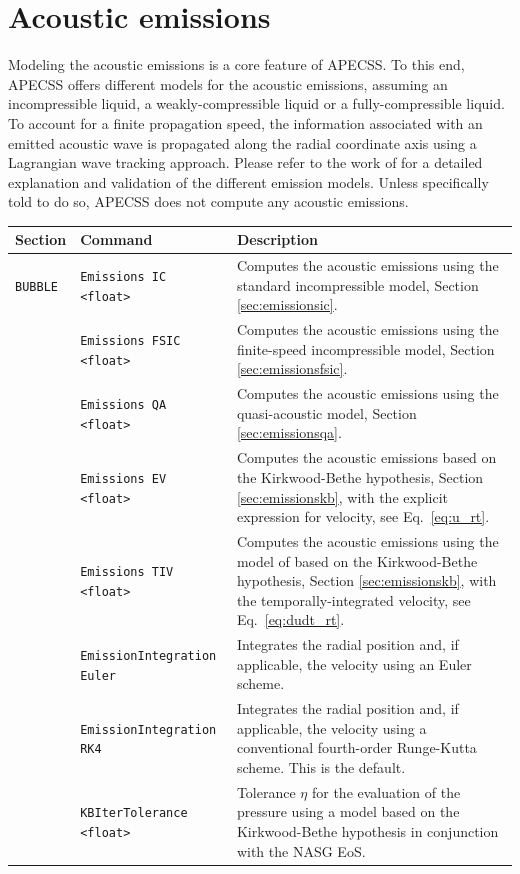 \chapter{Acoustic emissions}

Modeling the acoustic emissions is a core feature of APECSS. To this end, APECSS offers different models for the acoustic emissions, assuming an incompressible liquid, a weakly-compressible liquid or a fully-compressible liquid. To account for a finite propagation speed, the information associated with an emitted acoustic wave is propagated along the radial coordinate axis using a Lagrangian wave tracking approach. Please refer to the work of \citet{Denner2023} for a detailed explanation and validation of the different emission models. Unless specifically told to do so, APECSS does not compute any acoustic emissions. 

\vspace{0.8em}

\noindent
\begin{tabular}{p{} p{} p{}}
    \textbf{Section} &\textbf{Command} & \textbf{Description} 
\vspace{1mm} \\ \hline
{\tt BUBBLE} & {\tt Emissions IC <float>} & Computes the acoustic emissions using the standard incompressible model, Section \ref{sec:emissionsic}.\\ 
& {\tt Emissions FSIC <float>} & Computes the acoustic emissions using the finite-speed incompressible model, Section \ref{sec:emissionsfsic}.\\ 
& {\tt Emissions QA <float>} & Computes the acoustic emissions using the quasi-acoustic model, Section \ref{sec:emissionsqa}.\\ 
& {\tt Emissions EV <float>} & Computes the acoustic emissions based on the Kirkwood-Bethe hypothesis, Section \ref{sec:emissionskb}, with the explicit expression for velocity, see Eq.~\eqref{eq:u_rt}.\\ 
& {\tt Emissions TIV <float>} & Computes the acoustic emissions using the model of \citet{Hickling1963} based on the Kirkwood-Bethe hypothesis, Section \ref{sec:emissionskb}, with the temporally-integrated velocity, see Eq.~\eqref{eq:dudt_rt}.\\ 
& {\tt EmissionIntegration Euler} & Integrates the radial position and, if applicable, the velocity using an Euler scheme.\\
& {\tt EmissionIntegration RK4} & Integrates the radial position and, if applicable, the velocity using a conventional fourth-order Runge-Kutta scheme. This is the default.\\
& {\tt KBIterTolerance <float>} & Tolerance $\eta$ for the evaluation of the pressure using a model based on the Kirkwood-Bethe hypothesis in conjunction with the NASG EoS.\\
 \hline
\end{tabular} \vspace{0.2em}

